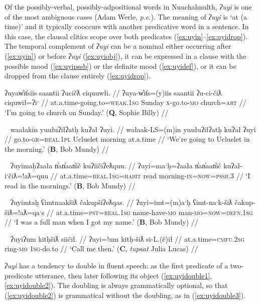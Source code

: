 Of the possibly-verbal, possibly-adpositional words in Nuuchahnulth, \textit{ʔuyi} is one of the most ambiguous cases (Adam Werle, \textit{p.c.}). The meaning of \textit{ʔuyi} is `at (a time)' and it typically cooccurs with another predicative word in a sentence. In this case, the clausal clitics scope over both predicates (\ref{ex:uyin}--\ref{ex:uyidrop}). The temporal complement of \textit{ʔuyi} can be a nominal either occurring after (\ref{ex:uyin}) or before \textit{ʔuyi} (\ref{ex:uyiobj}), it can be expressed in a clause with the possible mood (\ref{ex:uyipssb}) or the definite mood (\ref{ex:uyidef}), or it can be dropped from the clause entirely (\ref{ex:uyidrop}).

\ex \label{ex:uyin}
\begingl
\glpreamble ʔuyaw̓it̓siis saantii ʔucičƛ ciquuwłi. //
\gla ʔuya-w̓it̓s=(y)iis saantii ʔu-ci-čiƛ ciquwił=ʔiˑ //
\glb at.a.time-going.to=\textsc{weak.1sg} Sunday \textsc{x}-go.to-\textsc{mo} church=\textsc{art} //
\glft `I'm going to church on Sunday.' (\textbf{Q}, Sophie Billy) //
\endgl
\xe

\ex~ \label{ex:uyiobj}
\begingl
\glpreamble waałakin yuułuʔiłʔatḥ kuʔał ʔuyi. //
\gla wałaak-LS=(m)in yuułuʔiłʔatḥ kuʔał ʔuyi //
\glb go.to-\textsc{gr}=\textsc{real.1pl} Ucluelet morning at.a.time //
\glft `We're going to Ucluelet in the morning.' (\textbf{B}, Bob Mundy) //
\endgl
\xe

\ex~ \label{ex:uyipssb}
\begingl
\glpreamble ʔuyimaḥʔaała n̓an̓aan̓ič kuʔiičiʔeƛquu. //
\gla ʔuyi=maˑḥ=ʔaała n̓an̓aan̓ič kuʔał-iˑčiƛ=!aƛ=quu //
\glb at.a.time=\textsc{real.1sg}=\textsc{habit} read morning-\textsc{in}=\textsc{now}=\textsc{pssb.3} //
\glft `I read in the mornings.' (\textbf{B}, Bob Mundy) //
\endgl
\xe

\ex~ \label{ex:uyidef}
\begingl
\glpreamble ʔuyimtaḥ ʕimtnaakšiƛ čakupšiʔeƛqas. //
\gla ʔuyi=imt=(m)aˑḥ ʕimt-naˑk-šiƛ čakup-šiƛ=!aƛ=qaˑs //
\glb at.a.time=\textsc{pst}=\textsc{real.1sg} name-have-\textsc{mo} man-\textsc{mo}=\textsc{now}=\textsc{defn.1sg} //
\glft `I was a full man when I got my name.' (\textbf{B}, Bob Mundy) //
\endgl
\xe

\ex~ \label{ex:uyidrop}
\begingl
\glpreamble ʔuyiʔum kitḥšiƛ siičił. //
\gla ʔuyi=!um kitḥ-šiƛ si-L.(č)ił //
\glb at.a.time=\textsc{cmfu.2sg} ring-\textsc{mo} \textsc{1sg}-do.to //
\glft `Call me then.' (\textbf{C}, \textit{tupaat} Julia Lucas) //
\endgl
\xe

\textit{ʔuyi} has a tendency to double in fluent speech: as the first predicate of a two-predicate utterance, then later following its object (\ref{ex:uyidouble1}, \ref{ex:uyidouble2}). The doubling is always grammatically optional, so that (\ref{ex:uyidouble2}) is grammatical without the doubling, as in (\ref{ex:uyidouble3}).

